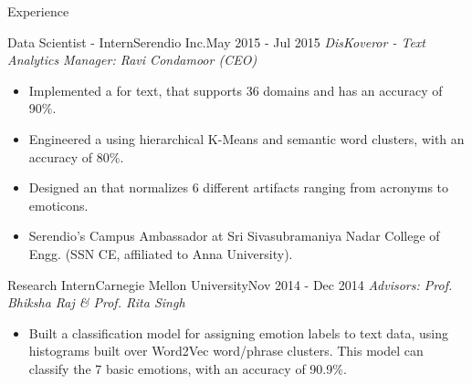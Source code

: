 \documentclass[]{mcdowellcv}
\begin{document}
\begin{cvsection}{Experience}
		\begin{cvsubsection}{Data Scientist - Intern}{Serendio Inc.}{May 2015 - Jul 2015}
		    \textit{DisKoveror - Text Analytics} \hfill \textit{Manager: Ravi Condamoor (CEO)}
			\begin{itemize}
            	\item Implemented a \href{https://github.com/tpsatish95/Universal-MultiDomain-Sentiment-Classifier}{\color{blue!70}{universal multi-domain sentiment scorer}} for text, that supports 36 domains and has an accuracy of 90\%.
                \item Engineered a \href{https://github.com/tpsatish95/Topic-Modeling-Social-Network-Text-Data}{\color{blue!70}{topic modeling algorithm}} using hierarchical K-Means and semantic word clusters, with an accuracy of 80\%.
                \item Designed an \href{https://github.com/tpsatish95/SocialTextFilter}{\color{blue!70}{internet-slang text parser}} that normalizes 6 different artifacts ranging from acronyms to emoticons.
                \item Serendio's Campus Ambassador at Sri Sivasubramaniya Nadar College of Engg. (SSN CE, affiliated to Anna University).
			\end{itemize}
		\end{cvsubsection}
		
		\begin{cvsubsection}{Research Intern}{Carnegie Mellon University}{Nov 2014 - Dec 2014}
		    \textit{\href{https://github.com/tpsatish95/emotion-detection-from-text}{\color{blue!70}{Text-based Emotion Recognition System}}} \hfill \textit{Advisors: Prof. Bhiksha Raj \& Prof. Rita Singh}
			\begin{itemize}
				\item Built a classification model for assigning emotion labels to text data, using histograms built over Word2Vec word/phrase clusters. This model can classify the 7 basic emotions, with an accuracy of 90.9\%.
			\end{itemize}
		\end{cvsubsection}
	\end{cvsection}
	
\end{document}
